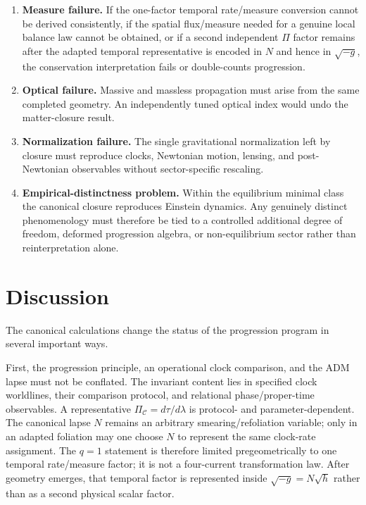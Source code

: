 \documentclass[11pt]{article}
\begin{document}
\begin{enumerate}[label=(\roman*)]
    \item \textbf{Measure failure.} If the one-factor temporal rate/measure conversion cannot be derived consistently, if the spatial flux/measure needed for a genuine local balance law cannot be obtained, or if a second independent $\Pi$ factor remains after the adapted temporal representative is encoded in $N$ and hence in $\sqrt{-g}$, the conservation interpretation fails or double-counts progression.

    \item \textbf{Optical failure.} Massive and massless propagation must arise from the same completed geometry. An independently tuned optical index would undo the matter-closure result.

    \item \textbf{Normalization failure.} The single gravitational normalization left by closure must reproduce clocks, Newtonian motion, lensing, and post-Newtonian observables without sector-specific rescaling.

    \item \textbf{Empirical-distinctness problem.} Within the equilibrium minimal class the canonical closure reproduces Einstein dynamics. Any genuinely distinct phenomenology must therefore be tied to a controlled additional degree of freedom, deformed progression algebra, or non-equilibrium sector rather than reinterpretation alone.
\end{enumerate}

\section{Discussion}

The canonical calculations change the status of the progression program in several important ways.

First, the progression principle, an operational clock comparison, and the ADM lapse must not be conflated. The invariant content lies in specified clock worldlines, their comparison protocol, and relational phase/proper-time observables. A representative $\Pi_{\mathcal C}=d\tau/d\lambda$ is protocol- and parameter-dependent. The canonical lapse $N$ remains an arbitrary smearing/refoliation variable; only in an adapted foliation may one choose $N$ to represent the same clock-rate assignment. The $q=1$ statement is therefore limited pregeometrically to one temporal rate/measure factor; it is not a four-current transformation law. After geometry emerges, that temporal factor is represented inside $\sqrt{-g}=N\sqrt h$ rather than as a second physical scalar factor.
\end{document}
